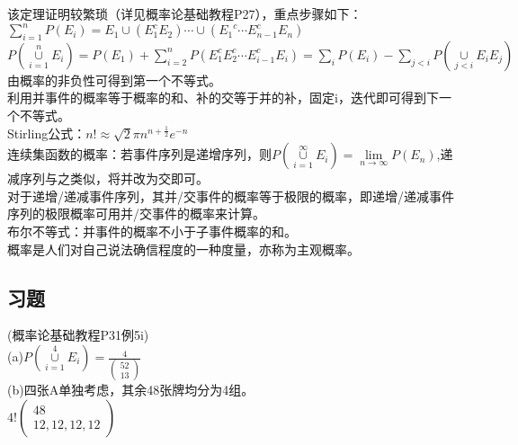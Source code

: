 \documentclass{book}%
\begin{document}
	该定理证明较繁琐（详见概率论基础教程P27），重点步骤如下：\\
	$\mathop\sum\limits_{i=1}^{n}P(E_{i})=E_{1}\cup (E_{1}^{c}E_{2})\cdots \cup ( {E_{1}}^{c}\cdots E_{n-1}^{c}E_{n})$\\
	$P(\mathop\cup\limits_{i=1}^{n}E_{i})=P(E_{1})+\sum\limits_{i=2}^{n}P(E_{1}^{c}E_{2}^{c}\cdots E_{i-1}^{c}E_{i})=\sum\limits_{i}P(E_{i})-\sum\limits_{j<i}P(\mathop\cup\limits_{j<i}E_{i}E_{j})$\\
	由概率的非负性可得到第一个不等式。\\
	利用并事件的概率等于概率的和、补的交等于并的补，固定i，迭代即可得到下一个不等式。\\
	Stirling公式：$n!\approx \sqrt{2}\pi n^{n+\frac{1}{2}}e^{-n}$\\
	连续集函数的概率：若事件序列是递增序列，则$P(\mathop\cup\limits_{i=1}^{\infty}E_{i})=\displaystyle\lim\limits_{n \to \infty}P(E_{n})$,递减序列与之类似，将并改为交即可。\\
	对于递增/递减事件序列，其并/交事件的概率等于极限的概率，即递增/递减事件序列的极限概率可用并/交事件的概率来计算。\\
	布尔不等式：并事件的概率不小于子事件概率的和。\\
	概率是人们对自己说法确信程度的一种度量，亦称为主观概率。\\
	
	\subsection{习题}
	(概率论基础教程P31例5i)\\
	(a)$P(\mathop\cup\limits_{i=1}^{4}E_{i})=\frac{4}{\begin{pmatrix}52\\13\end{pmatrix}}$\\
	(b)四张A单独考虑，其余48张牌均分为4组。\\
	$4!\begin{pmatrix}48\\12,12,12,12\end{pmatrix}$
	~\\
	
\end{document}
